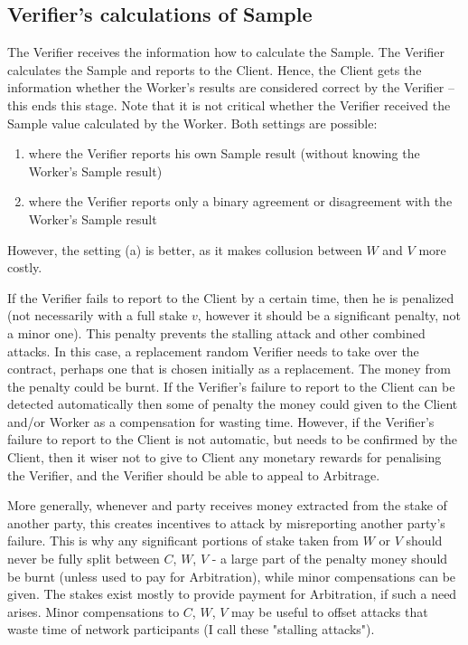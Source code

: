 \documentclass{article}
\providecommand{\tightlist}{%
  \setlength{\itemsep}{0pt}%
  \setlength{\parskip}{0pt}%
  \setlength{\topsep}{0pt}}
\begin{document}
\subsection{Verifier's calculations of Sample}
\label{verification}

The Verifier receives the information how to calculate the Sample. The Verifier calculates the Sample and reports to the Client. Hence, the Client gets the information whether the Worker's results are considered correct by the Verifier – this ends this stage. Note that it is not critical whether the Verifier received the Sample value calculated by the Worker. Both settings are possible:
\renewcommand{\labelenumi}{(\alph{enumi})}
\begin{enumerate}[topsep=0pt]
    \tightlist
    \item where the Verifier reports his own Sample result (without knowing the Worker's Sample result)
    \item where the Verifier reports only a binary agreement or disagreement with the Worker's Sample result
\end{enumerate}
However, the setting (a) is better, as it makes collusion between $W$ and $V$ more costly.

If the Verifier fails to report to the Client by a certain time, then he is penalized (not necessarily with a full stake $v$, however it should be a significant penalty, not a minor one). This penalty prevents the stalling attack and other combined attacks. In this case, a replacement random Verifier needs to take over the contract, perhaps one that is chosen initially as a replacement. The money from the penalty could be burnt. If the Verifier's failure to report to the Client can be detected automatically then some of penalty the money could given to the Client and/or Worker  as a compensation for wasting time. However, if the Verifier's failure to report to the Client is not automatic, but needs to be confirmed by the Client, then it wiser not to give to Client any monetary rewards for penalising the Verifier, and the Verifier should be able to appeal to Arbitrage.

More generally, whenever and party receives money extracted from the stake of another party, this creates incentives to attack by misreporting another party's failure. This is why any significant portions of stake taken from $W$ or $V$ should never be fully split between $C$, $W$, $V$ - a large part of the penalty money should be burnt (unless used to pay for Arbitration), while minor compensations can be given. The stakes exist mostly to provide payment for Arbitration, if such a need arises. Minor compensations to $C$, $W$, $V$ may be useful to offset attacks that waste time of network participants (I call these "stalling attacks").
\end{document}

